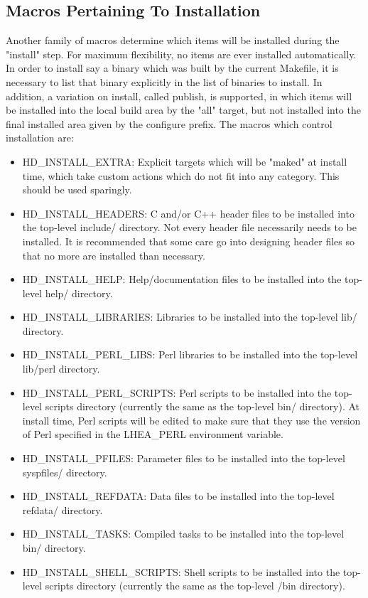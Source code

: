 \documentclass[11pt]{book}
\begin{document}
\subsection{Macros Pertaining To Installation}
Another family of macros determine which items will be installed
during the "install" step. For maximum flexibility, no items
are ever installed automatically. In order to install
say a binary which was built by the current Makefile, it is
necessary to list that binary explicitly in the list of binaries
to install. In addition, a variation on install, called publish,
is supported, in which items will be installed into the local
build area by the "all" target, but not installed into the
final installed area given by the configure prefix. The
macros which control installation are:

\begin{itemize}
\item HD\_INSTALL\_EXTRA: Explicit targets which will
be "maked" at install time, which take custom actions which do
not fit into any category. This should be used sparingly.
\item HD\_INSTALL\_HEADERS: C and/or C++ header files to
be installed into the top-level include/ directory. Not
every header file necessarily needs to be installed. It
is recommended that some care go into designing header
files so that no more are installed than necessary.
\item HD\_INSTALL\_HELP: Help/documentation files to
be installed into the top-level help/ directory.
\item HD\_INSTALL\_LIBRARIES: Libraries to be installed
into the top-level lib/ directory.
\item HD\_INSTALL\_PERL\_LIBS: Perl libraries to be installed
into the top-level lib/perl directory.
\item HD\_INSTALL\_PERL\_SCRIPTS: Perl scripts to be installed
into the top-level scripts directory (currently the same as the top-level
bin/ directory). At install
time, Perl scripts will be edited to make sure that they use
the version of Perl specified in the LHEA\_PERL environment
variable.
\item HD\_INSTALL\_PFILES: Parameter files to be installed
into the top-level syspfiles/ directory.
\item HD\_INSTALL\_REFDATA: Data files to be installed
into the top-level refdata/ directory.
\item HD\_INSTALL\_TASKS: Compiled tasks to be installed
into the top-level bin/ directory.
\item HD\_INSTALL\_SHELL\_SCRIPTS: Shell scripts to be installed
into the top-level scripts directory (currently the same as the top-level
/bin directory).
\end{itemize}
\end{document}

